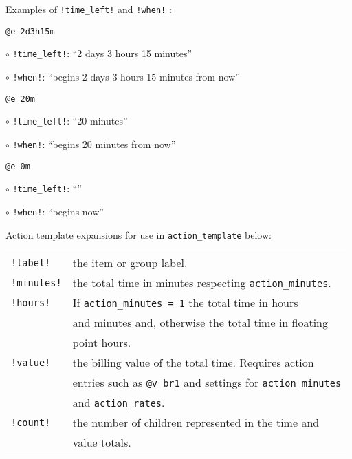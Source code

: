 \documentclass[9pt,landscape]{article}
\begin{document}
\begin{multicols}{3}
Examples of \verb'!time_left!' and \verb'!when!' :
\begin{compactitem}
\item \verb!@e 2d3h15m!
    \begin{compactitem}
        \item[$\circ$] \verb'!time_left!': ``2 days 3 hours 15 minutes''
        \item[$\circ$] \verb'!when!': ``begins 2 days 3 hours 15 minutes from now''
    \end{compactitem}
\item \verb!@e 20m!
    \begin{compactitem}
        \item[$\circ$] \verb'!time_left!': ``20 minutes''
        \item[$\circ$] \verb'!when!': ``begins 20 minutes from now''
    \end{compactitem}
\item \verb!@e 0m!
    \begin{compactitem}
        \item[$\circ$] \verb'!time_left!': ``''
        \item[$\circ$] \verb'!when!': ``begins now''
    \end{compactitem}
\end{compactitem}

Action template expansions for use in \verb!action_template! below:

\begin{tabular}{@{}ll@{}}
\verb'!label!' & the item or group label. \\
\verb'!minutes!' &  the total time in minutes respecting \verb!action_minutes!. \\
\verb'!hours!' & If \verb!action_minutes = 1! the total time in hours \\
               & and minutes and, otherwise the total time in floating \\
               & point hours. \\
\verb'!value!' & the billing value of the total time. Requires action \\
               & entries such as \verb!@v br1! and settings  for \verb!action_minutes! \\
               & and \verb!action_rates!. \\
\verb'!count!' & the number of children represented in the time and \\
               & value totals. \\
\end{tabular}


\end{multicols}
\end{document}
